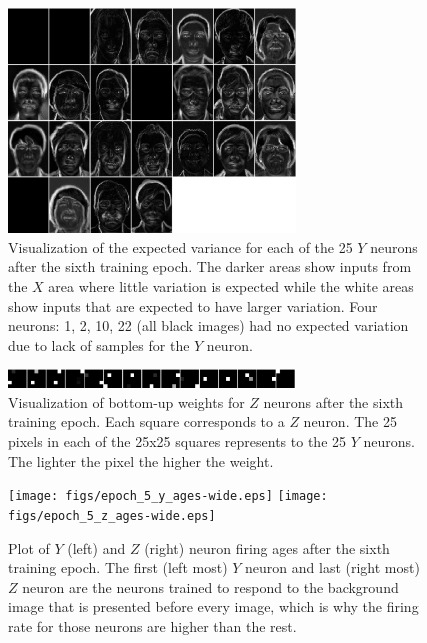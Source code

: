 \documentclass[conference]{IEEEtran}
\begin{document}
\begin{figure}
\center
\includegraphics[width=3in]{figs/epoch_5_0_sigmas.eps}
\caption{Visualization of the expected variance for each of the 25 $Y$ neurons after the sixth training epoch.  The darker areas show inputs from the $X$ area where little variation is expected while the white areas show inputs that are expected to have larger variation.  Four neurons: 1, 2, 10, 22 (all black images) had no expected variation due to lack of samples for the $Y$ neuron.}
\label{fig:y_sigmas}
\end{figure}

\begin{figure}
\center
\includegraphics[width=3in]{figs/epoch_5_0_yz.eps}
\caption{Visualization of bottom-up weights for $Z$ neurons after the sixth training epoch.  Each square corresponds to a $Z$ neuron.  The 25 pixels in each of the 25x25 squares represents to the 25 $Y$ neurons. 
The lighter the pixel the higher the weight.}
\label{fig:z_weights}
\end{figure}

\begin{figure}
\center
\fontsize{8}{12}\selectfont
\texttt{[image: figs/epoch\_5\_y\_ages-wide.eps]}
\texttt{[image: figs/epoch\_5\_z\_ages-wide.eps]}
\caption{Plot of $Y$ (left) and $Z$ (right) neuron firing ages after the sixth training epoch.  The first (left most) $Y$ neuron and last (right most) $Z$ neuron are the neurons trained to respond to the background image that is presented before every image, which is why the firing rate for those neurons are higher than the rest.}
\label{fig:ages}
\end{figure}
\end{document}
